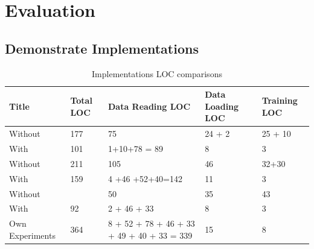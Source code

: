 \chapter{Evaluation}

\section{Demonstrate Implementations}
% 



\begin{table}[ht]
	\caption{Implementations LOC comparisons} %
	\centering %
	\begin{tabular}{p{}p{}p{}p{}p{}} %
		\hline\hline %
		Title & Total LOC  & Data Reading LOC & Data Loading LOC & Training LOC  \\ [0.5ex] %
		\hline %
		\citet{park2020augmenting} Without & 177  & 75 & 24 + 2 & 25 + 10  \\ \hline
		\citet{park2020augmenting} With & 101 & 1+10+78 = 89 & 8 & 3  \\ \hline
		\citet{georgiev2017low} Without & 211  & 105 & 46 & 32+30   \\ \hline
		\citet{georgiev2017low} With & 159 & 4 +46 +52+40=142 & 11 & 3 \\ \hline
		\citet{xu2019multi} Without &  & 50 & 35 & 43   \\ \hline
		\citet{xu2019multi} With & 92 & 2 + 46 + 33 & 8 & 3  \\ \hline
		Own Experiments & 364 & 8 + 52 + 78 + 46 + 33 + 49 + 40 + 33 = 339 & 15 & 8  \\ \hline
	\end{tabular}
	\label{table:LOC} %
\end{table}

